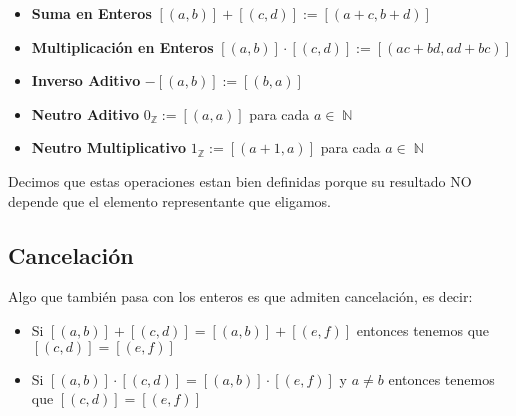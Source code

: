 \documentclass[12pt, fleqn]{report}                             %
\DeclareMathOperator \Naturals  {\mathbb{N}}                     %
\DeclareMathOperator \Integers  {\mathbb{Z}}                     %
\begin{document}
            \begin{itemize}
                \item
                    \textbf{Suma en Enteros}
                    $[(a,b)] + [(c,d)] := [(a+c, b+d)]$

                \item
                    \textbf{Multiplicación en Enteros}
                    $[(a,b)] \cdot [(c,d)] := [(ac+bd, ad+bc)]$

                \item
                    \textbf{Inverso Aditivo}
                    $-[(a,b)] := [(b,a)]$

                \item
                    \textbf{Neutro Aditivo}
                    $0_{\Integers} := [(a,a)]$ para cada $a \in \Naturals$

                 \item
                    \textbf{Neutro Multiplicativo}
                    $1_{\Integers} := [(a+1,a)]$ para cada $a \in \Naturals$
            \end{itemize}


            Decimos que estas operaciones estan bien definidas porque su resultado NO depende que 
            el elemento representante que eligamos.


            \subsection*{Cancelación}

                Algo que también pasa con los enteros es que admiten cancelación, es decir:
                \begin{itemize}
                    \item
                        Si  $[(a,b)] + [(c,d)] = [(a,b)] + [(e,f)]$ entonces tenemos que
                        $[(c,d)] = [(e,f)]$

                    \item
                        Si  $[(a,b)] \cdot [(c,d)] = [(a,b)] \cdot [(e,f)]$ y $a \neq b$ entonces
                        tenemos que $[(c,d)] = [(e,f)]$
                \end{itemize}






\end{document}
